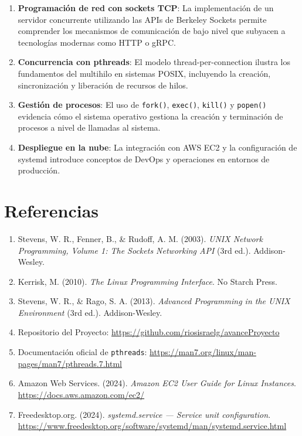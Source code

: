 \documentclass[12pt,a4paper]{report}
\begin{document}
\begin{enumerate}[leftmargin=1.5em]
  \item \textbf{Programación de red con sockets TCP}: La implementación de un servidor concurrente utilizando las APIs de Berkeley Sockets permite comprender los mecanismos de comunicación de bajo nivel que subyacen a tecnologías modernas como HTTP o gRPC.

  \item \textbf{Concurrencia con pthreads}: El modelo thread-per-connection ilustra los fundamentos del multihilo en sistemas POSIX, incluyendo la creación, sincronización y liberación de recursos de hilos.

  \item \textbf{Gestión de procesos}: El uso de \texttt{fork()}, \texttt{exec()}, \texttt{kill()} y \texttt{popen()} evidencia cómo el sistema operativo gestiona la creación y terminación de procesos a nivel de llamadas al sistema.

  \item \textbf{Despliegue en la nube}: La integración con AWS EC2 y la configuración de systemd introduce conceptos de DevOps y operaciones en entornos de producción.
\end{enumerate}


\chapter*{Referencias}

\begin{enumerate}[leftmargin=1.5em]
  \item Stevens, W. R., Fenner, B., \& Rudoff, A. M. (2003). \textit{UNIX Network Programming, Volume 1: The Sockets Networking API} (3rd ed.). Addison-Wesley.
  \item Kerrisk, M. (2010). \textit{The Linux Programming Interface}. No Starch Press.
  \item Stevens, W. R., \& Rago, S. A. (2013). \textit{Advanced Programming in the UNIX Environment} (3rd ed.). Addison-Wesley.
  \item Repositorio del Proyecto: \url{https://github.com/riosisraelg/avanceProyecto}
  \item Documentación oficial de \texttt{pthreads}: \url{https://man7.org/linux/man-pages/man7/pthreads.7.html}
  \item Amazon Web Services. (2024). \textit{Amazon EC2 User Guide for Linux Instances}. \url{https://docs.aws.amazon.com/ec2/}
  \item Freedesktop.org. (2024). \textit{systemd.service — Service unit configuration}. \url{https://www.freedesktop.org/software/systemd/man/systemd.service.html}
\end{enumerate}
\end{document}

